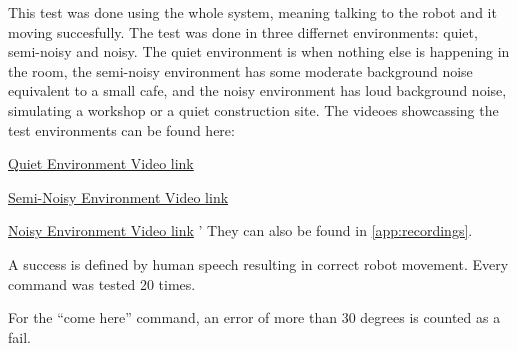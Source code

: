 \begin{table}[H]
    \centering
    \caption{Robot Command Execution Accuracy Across Different Noise Environments}
    \label{tab:command_accuracy_all}
\end{table}



This test was done using the whole system, meaning talking to the robot and it moving succesfully. The test was done in three differnet environments: quiet, semi-noisy and noisy. The quiet environment is when nothing else is happening in the room, the semi-noisy environment has some moderate background noise equivalent to a small cafe, and the noisy environment has loud background noise, simulating a workshop or a quiet construction site.
The videoes showcassing the test environments can be found here:

\href{https://youtube.com/shorts/-Jo3rEJsfjg?feature=share}{Quiet Environment Video link}

\href{https://youtube.com/shorts/5an6NhUYo2M?feature=share}{Semi-Noisy Environment Video link}

\href{https://youtube.com/shorts/m3pxYh3Ubt0?feature=share}{Noisy Environment Video link}
'
They can also be found in \cref{app:recordings}.

A success is defined by human speech resulting in correct robot movement. Every command was tested 20 times.

For the ``come here'' command, an error of more than 30 degrees is counted as a fail.

